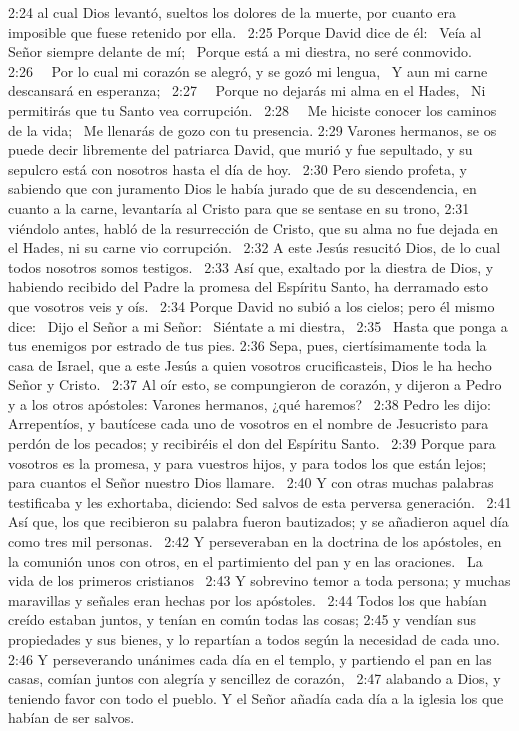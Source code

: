 2:24 al cual Dios levantó, sueltos los dolores de la muerte, por cuanto era imposible que fuese retenido por ella.  
2:25 Porque David dice de él:  
Veía al Señor siempre delante de mí;  
Porque está a mi diestra, no seré conmovido. 
2:26   Por lo cual mi corazón se alegró, y se gozó mi lengua,  
Y aun mi carne descansará en esperanza;  
2:27   Porque no dejarás mi alma en el Hades,  
Ni permitirás que tu Santo vea corrupción.  
2:28   Me hiciste conocer los caminos de la vida;  
Me llenarás de gozo con tu presencia. 
2:29 Varones hermanos, se os puede decir libremente del patriarca David, que murió y fue sepultado, y su sepulcro está con nosotros hasta el día de hoy.  
2:30 Pero siendo profeta, y sabiendo que con juramento Dios le había jurado que de su descendencia, en cuanto a la carne, levantaría al Cristo para que se sentase en su trono, 
2:31 viéndolo antes, habló de la resurrección de Cristo, que su alma no fue dejada en el Hades, ni su carne vio corrupción.  
2:32 A este Jesús resucitó Dios, de lo cual todos nosotros somos testigos.  
2:33 Así que, exaltado por la diestra de Dios, y habiendo recibido del Padre la promesa del Espíritu Santo, ha derramado esto que vosotros veis y oís.  
2:34 Porque David no subió a los cielos; pero él mismo dice:  
Dijo el Señor a mi Señor:  
Siéntate a mi diestra,  
2:35  Hasta que ponga a tus enemigos por estrado de tus pies. 
2:36 Sepa, pues, ciertísimamente toda la casa de Israel, que a este Jesús a quien vosotros crucificasteis, Dios le ha hecho Señor y Cristo.  
2:37 Al oír esto, se compungieron de corazón, y dijeron a Pedro y a los otros apóstoles: Varones hermanos, ¿qué haremos?  
2:38 Pedro les dijo: Arrepentíos, y bautícese cada uno de vosotros en el nombre de Jesucristo para perdón de los pecados; y recibiréis el don del Espíritu Santo.  
2:39 Porque para vosotros es la promesa, y para vuestros hijos, y para todos los que están lejos; para cuantos el Señor nuestro Dios llamare.  
2:40 Y con otras muchas palabras testificaba y les exhortaba, diciendo: Sed salvos de esta perversa generación.  
2:41 Así que, los que recibieron su palabra fueron bautizados; y se añadieron aquel día como tres mil personas.  
2:42 Y perseveraban en la doctrina de los apóstoles, en la comunión unos con otros, en el partimiento del pan y en las oraciones.  
La vida de los primeros cristianos  
2:43 Y sobrevino temor a toda persona; y muchas maravillas y señales eran hechas por los apóstoles.  
2:44 Todos los que habían creído estaban juntos, y tenían en común todas las cosas; 
2:45 y vendían sus propiedades y sus bienes, y lo repartían a todos según la necesidad de cada uno. 
2:46 Y perseverando unánimes cada día en el templo, y partiendo el pan en las casas, comían juntos con alegría y sencillez de corazón,  
2:47 alabando a Dios, y teniendo favor con todo el pueblo. Y el Señor añadía cada día a la iglesia los que habían de ser salvos.  
